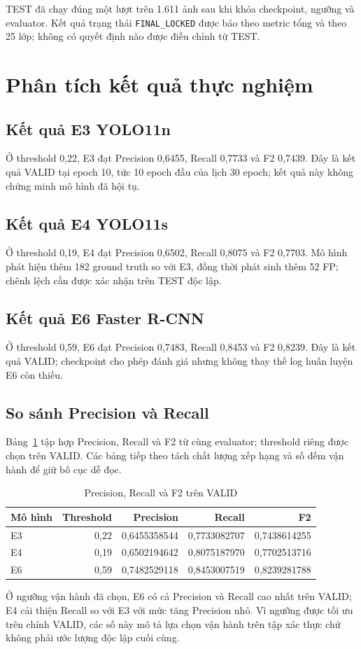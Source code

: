 \documentclass[12pt,a4paper,oneside]{report}
\begin{document}
TEST đã chạy đúng một lượt trên 1.611 ảnh sau khi khóa checkpoint, ngưỡng và evaluator. Kết quả trạng thái \texttt{FINAL\_LOCKED} được báo theo metric tổng và theo 25 lớp; không có quyết định nào được điều chỉnh từ TEST.
\section{Phân tích kết quả thực nghiệm}\label{chap:results}
\subsection{Kết quả E3 YOLO11n}
Ở threshold 0,22, E3 đạt Precision 0,6455, Recall 0,7733 và F2 0,7439. Đây là kết quả VALID tại epoch 10, tức 10 epoch đầu của lịch 30 epoch; kết quả này không chứng minh mô hình đã hội tụ.
\subsection{Kết quả E4 YOLO11s}
Ở threshold 0,19, E4 đạt Precision 0,6502, Recall 0,8075 và F2 0,7703. Mô hình phát hiện thêm 182 ground truth so với E3, đồng thời phát sinh thêm 52 FP; chênh lệch cần được xác nhận trên TEST độc lập.
\subsection{Kết quả E6 Faster R-CNN}
Ở threshold 0,59, E6 đạt Precision 0,7483, Recall 0,8453 và F2 0,8239. Đây là kết quả VALID; checkpoint cho phép đánh giá nhưng không thay thế log huấn luyện E6 còn thiếu.
\subsection{So sánh Precision và Recall}
Bảng~\ref{tab:fullmetrics} tập hợp Precision, Recall và F2 từ cùng evaluator; threshold riêng được chọn trên VALID. Các bảng tiếp theo tách chất lượng xếp hạng và số đếm vận hành để giữ bố cục dễ đọc.
\begin{table}[H]\centering\small
\caption{Precision, Recall và F2 trên VALID}\label{tab:fullmetrics}
\begin{tabular}{lrrrr}\toprule
Mô hình & Threshold & Precision & Recall & F2\\\midrule
E3 & 0,22 & 0,6455358544 & 0,7733082707 & 0,7438614255\\
E4 & 0,19 & 0,6502194642 & 0,8075187970 & 0,7702513716\\
E6 & 0,59 & 0,7482529118 & 0,8453007519 & 0,8239281788\\
\bottomrule\end{tabular}\end{table}
Ở ngưỡng vận hành đã chọn, E6 có cả Precision và Recall cao nhất trên VALID; E4 cải thiện Recall so với E3 với mức tăng Precision nhỏ. Vì ngưỡng được tối ưu trên chính VALID, các số này mô tả lựa chọn vận hành trên tập xác thực chứ không phải ước lượng độc lập cuối cùng.
\end{document}
